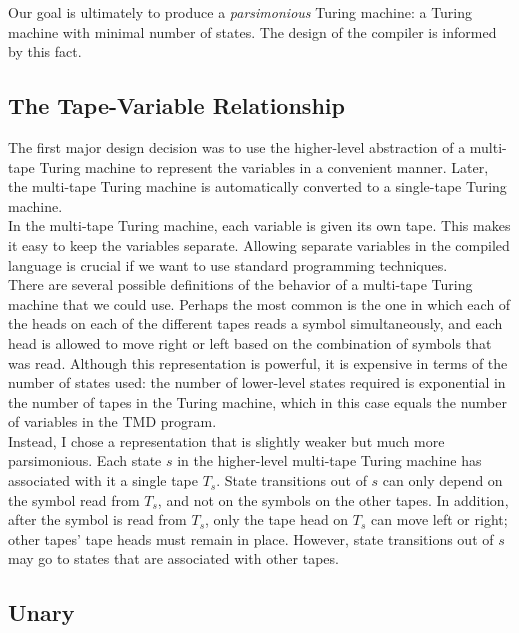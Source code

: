 Our goal is ultimately to produce a \emph{parsimonious} Turing machine: a Turing machine with minimal number of states. The design of the compiler is informed by this fact. \\

\subsection{The Tape-Variable Relationship}

The first major design decision was to use the higher-level abstraction of a multi-tape Turing machine to represent the variables in a convenient manner. Later, the multi-tape Turing machine is automatically converted to a single-tape Turing machine.  \\

In the multi-tape Turing machine, each variable is given its own tape. This makes it easy to keep the variables separate. Allowing separate variables in the compiled language is crucial if we want to use standard programming techniques. \\

There are several possible definitions of the behavior of a multi-tape Turing machine that we could use. Perhaps the most common is the one in which each of the heads on each of the different tapes reads a symbol simultaneously, and each head is allowed to move right or left based on the combination of symbols that was read. Although this representation is powerful, it is expensive in terms of the number of states used: the number of lower-level states required is exponential in the number of tapes in the Turing machine, which in this case equals the number of variables in the TMD program. \\

Instead, I chose a representation that is slightly weaker but much more parsimonious. Each state $s$ in the higher-level multi-tape Turing machine has associated with it a single tape $T_s$. State transitions out of $s$ can only depend on the symbol read from $T_s$, and not on the symbols on the other tapes. In addition, after the symbol is read from $T_s$, only the tape head on $T_s$ can move left or right; other tapes' tape heads must remain in place. However, state transitions out of $s$ may go to states that are associated with other tapes. 

\subsection{Unary}

